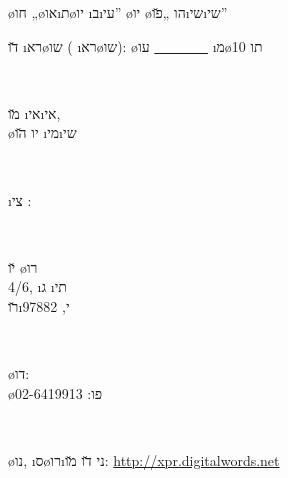 \begin{center}
	\o{חו} „\o{או}\i{ת}\o{יו} \i{ב}\i{עי}” \o{יו} \o{הו} „\u{פו}\i{שי}\i{שי}”


	\u{דו} \i{רא}\o{שו} ( \i{רא}\o{שו}): \o{עו} \underline{~ ~ ~ ~ ~} \i{מ}\o{תו} 10

	\vfill

	~

	\vfill

	\middlelinenormal

	\u{מו}  \i{אי}\i{אי},\\
	\o{יו} \u{הו} \i{מי}\i{שי}

	\vfill

	~

	\vfill

	\middlelinenormal

	\i{צי} :

	~

	\u{יו} \o{רו}\\
	 4/6, \i{ג} \i{תי}\\
	\u{רו}\i{י}, 97882

	~

	\o{דו}: \\
	\o{פו}: 02-6419913

	~

	 \o{נו},  \i{ס}\o{רו}\i{ני} \u{דו} \u{מו}:
	\url{http://xpr.digitalwords.net}
\end{center}
